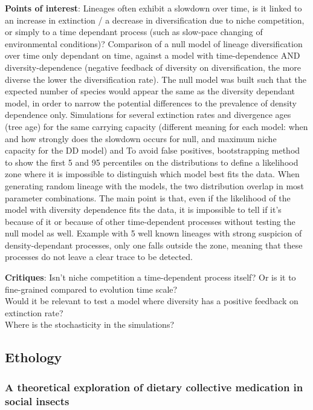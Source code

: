\documentclass[12pt,a4paper]{article}
\begin{document}
\textbf{Points of interest}: Lineages often exhibit a slowdown over time, is it linked to an increase in extinction / a decrease in diversification due to niche competition, or simply to a time dependant process (such as slow-pace changing of environmental conditions)? Comparison of a null model of lineage diversification over time only dependant on time, against a model with time-dependence AND diversity-dependence (negative feedback of diversity on diversification, the more diverse the lower the diversification rate). The null model was built such that the expected number of species would appear the same as the diversity dependant model, in order to narrow the potential differences to the prevalence of density dependence only. Simulations for several extinction rates and divergence ages (tree age) for the same carrying capacity (different meaning for each model: when and how strongly does the slowdown occurs for null, and maximum niche capacity for the DD model) and
To avoid false positives, bootstrapping method to show the first 5 and 95 percentiles on the distributions to define a likelihood zone where it is impossible to distinguish which model best fits the data.
When generating random lineage with the models, the two distribution overlap in most parameter combinations.
The main point is that, even if the likelihood of the model with diversity dependence fits the data, it is impossible to tell if it's because of it or because of other time-dependent processes without testing the null model as well.
Example with 5 well known lineages with strong suspicion of density-dependant processes, only one falls outside the zone, meaning that these processes do not leave a clear trace to be detected.

\textbf{Critiques}: Isn't niche competition a time-dependent process itself? Or is it to fine-grained compared to evolution time scale?\\
Would it be relevant to test a model where diversity has a positive feedback on extinction rate?\\
Where is the stochasticity in the simulations?

\newpage

\subsection*{Ethology}

\subsubsection*{A theoretical exploration of dietary collective medication in social insects}
\end{document}
